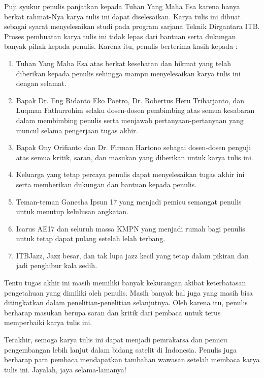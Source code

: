 Puji syukur penulis panjatkan kepada Tuhan Yang Maha Esa karena hanya berkat
rahmat-Nya karya tulis ini dapat diselesaikan. Karya tulis ini dibuat sebagai
syarat menyelesaikan studi pada program sarjana Teknik Dirgantara ITB. Proses
pembuatan karya tulis ini tidak lepas dari bantuan serta dukungan banyak pihak
kepada penulis. Karena itu, penulis berterima kasih kepada :

\begin{enumerate}
\item Tuhan Yang Maha Esa atas berkat kesehatan dan hikmat yang telah diberikan kepada penulis sehingga mampu menyelesaikan karya tulis ini dengan selamat.
\item Bapak Dr. Eng Ridanto Eko Poetro, Dr. Robertus Heru Triharjanto, dan Luqman Fathurrohim selaku dosen-dosen pembimbing atas semua kesabaran dalam membimbing penulis serta menjawab pertanyaan-pertanyaan yang muncul selama pengerjaan tugas akhir.
\item Bapak Ony Orifianto dan Dr. Firman Hartono sebagai dosen-dosen penguji atas semua kritik, saran, dan masukan yang diberikan untuk karya tulis ini.
\item Keluarga yang tetap percaya penulis dapat menyelesaikan tugas akhir ini serta memberikan dukungan dan bantuan kepada penulis.
\item Teman-teman Ganesha Ipsun 17 yang menjadi pemicu semangat penulis untuk menutup kelulusan angkatan. 
\item Icarus AE17 dan seluruh massa KMPN yang menjadi rumah bagi penulis untuk tetap dapat pulang setelah lelah terbang.
\item ITBJazz, Jazz besar, dan tak lupa jazz kecil yang tetap dalam pikiran dan jadi penghibur kala sedih.
\end{enumerate}

Tentu tugas akhir ini masih memiliki banyak kekurangan akibat keterbatasan
pengetahuan yang dimiliki oleh penulis. Masih banyak hal juga yang masih
bisa ditingkatkan dalam penelitian-penelitian selanjutnya. Oleh karena itu,
penulis berharap masukan berupa saran dan kritik dari pembaca untuk terus
memperbaiki karya tulis ini.

Terakhir, semoga karya tulis ini dapat menjadi pemrakarsa dan pemicu
pengembangan lebih lanjut dalam bidang satelit di Indonesia. Penulis juga
berharap para pembaca mendapatkan tambahan wawasan setelah membaca karya tulis
ini. Jayalah, jaya selama-lamanya!
